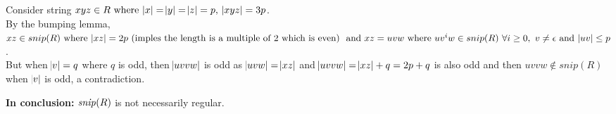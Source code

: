 \documentclass[11pt]{article}
\newcommand{\id}[1]{\mbox{\textit{#1}}}
\begin{document}
\begin{enumerate}
Consider string $xyz \in R \text{ where } \abs{x} = \abs{y} = \abs{z} = p,\ \abs{xyz} = 3p$. \\
By the bumping lemma, $xz \in snip(R) \text{ where } \abs{xz} = 2p \text{ (imples the length is a multiple of 2 which is even) } \text{ and } xz = uvw \text{ where } uv^{i}w \in snip(R)\ \forall i \geq 0,\ v \neq \epsilon \text{ and } \abs{uv} \leq p$. \\
But when $\abs{v} = q$ where $q$ is odd, then $\abs{uvvw}$ is odd as $\abs{uvw} = \abs{xz}$ and $\abs{uvvw} = \abs{xz} + q = 2p + q$ is also odd and then $uvvw \notin snip(R)$ when $\abs{v}$ is odd, a contradiction. 

\textbf{In conclusion:} $\id{snip}(R)$ is not necessarily regular.
\end{enumerate}
\end{document}

